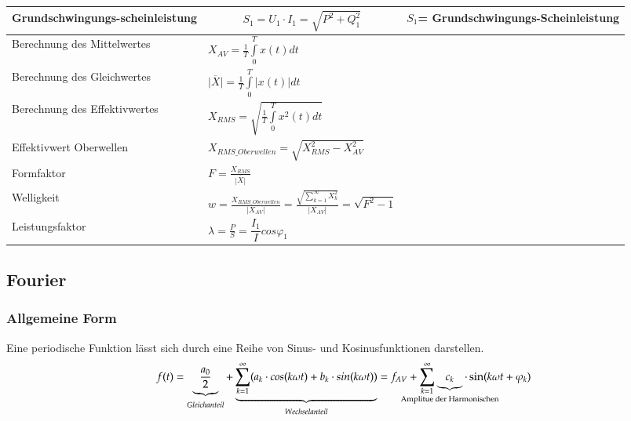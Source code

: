 \begin{longtable}{| p{} | p{} |p{}|}
    \textbf{\color{green}Grundschwingungs-\newline scheinleistung}&
    \vspace{-0.5cm}\[ S_1=U_1\cdot I_1 = \sqrt{P^2+Q_1^2} \]\vspace{-0.5cm}&
    $ S_1 $= Grundschwingungs-Scheinleistung
    \\ \hline    
    \hline
    Berechnung des Mittelwertes&
    $X_{AV} = \frac{1}{T}\int\limits_{0}^{T}x(t)dt$
    &\\
    \hline
    Berechnung des Gleichwertes
    & $\overline{|X|} = \frac{1}{T} \int\limits_{0}^{T} |x(t)|dt$
    &\\
    \hline
    Berechnung des Effektivwertes
    & $X_{RMS} = \sqrt{\frac{1}{T}\int\limits_{0}^{T}x^2(t)dt}$
    &\\
    \hline
    Effektivwert Oberwellen
    & $X_{RMS\_Oberwellen} = \sqrt{X_{RMS}^2 - X_{AV}^2}$
    &\\
    \hline
    Formfaktor
    & $F = \frac{X_{RMS}}{\overline{|X|}}$
    &\\
    \hline
    Welligkeit
    & $w = \frac{X_{RMS\_Oberwellen}}{|X_{AV}|}= \frac{\sqrt{\sum\limits_{k = 1}^{\infty}X_{k}^2}}{|X_{AV}|} = \sqrt{F^2-1}$
    &\\
    \hline
    Leistungsfaktor&
    $ \lambda = \frac{P}{S} = \dfrac{I_1}{I}cos\varphi_1 $
    &\\ \hline 
\end{longtable}
\clearpage

\subsection{Fourier}%
\subsubsection{Allgemeine Form}
Eine periodische Funktion lässt sich durch eine Reihe von Sinus- und Kosinusfunktionen darstellen.
$$f(t) = \underbrace{\frac{a_{0}}{2}}_{Gleichanteil}+\underbrace{\sum_{k = 1}^{\infty} (a_{k} \cdot cos(k \omega t)+ b_{k} \cdot sin(k \omega t))}_{Wechselanteil} = f_{AV}+ \sum_{k = 1}^{\infty} \underbrace{c_k}_{\makebox[0pt]{\text{\scriptsize Amplitue der Harmonischen}}} \cdot \sin(k\omega t + \varphi_k)$$

